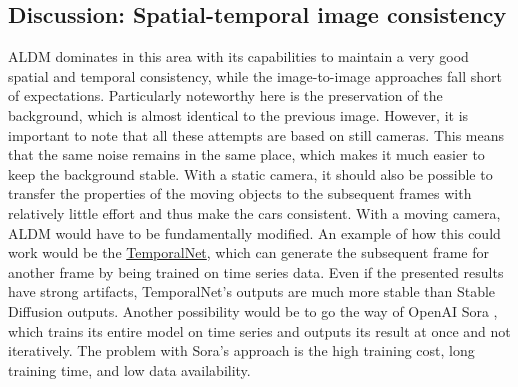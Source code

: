 \subsection{Discussion: Spatial-temporal image consistency}
ALDM dominates in this area with its capabilities to maintain a very good spatial and temporal consistency, while the image-to-image approaches fall short of expectations. Particularly noteworthy here is the preservation of the background, which is almost identical to the previous image. However, it is important to note that all these attempts are based on still cameras. This means that the same noise remains in the same place, which makes it much easier to keep the background stable. With a static camera, it should also be possible to transfer the properties of the moving objects to the subsequent frames with relatively little effort and thus make the cars consistent. With a moving camera, ALDM would have to be fundamentally modified. An example of how this could work would be the \href{https://huggingface.co/CiaraRowles/TemporalNet}{TemporalNet}, which can generate the subsequent frame for another frame by being trained on time series data. Even if the presented results have strong artifacts, TemporalNet's outputs are much more stable than Stable Diffusion outputs. Another possibility would be to go the way of OpenAI Sora  \cite{liu2024sorareviewbackgroundtechnology}, which trains its entire model on time series and outputs its result at once and not iteratively. The problem with Sora's approach is the high training cost, long training time, and low data availability.  